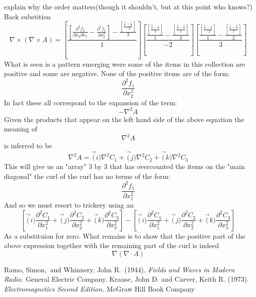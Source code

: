 \documentclass[12pt]{article}
\begin{document}
explain why the order matters(though it shouldn't, but at this point who knows?)
Back substition
\begin{equation}
\nabla \times (\nabla \times A) = \left[ \frac{\left[ \frac {\partial^2  f_2}{\partial x_2 \partial x_1} - \frac {\partial^2  f_1}{\partial x_2^2} \right] - \frac{\left[ \frac{\frac{3}{1} - \frac{1}{3}}{-2} \right]}{3}}{1} \right] \left[ \frac{\frac{\left[ \frac{\frac{2}{1} - \frac{1}{2}}{3} \right]}{1} - \frac{\left[ \frac{\frac{3}{2} - \frac{2}{3}}{1} \right]}{3}}{-2} \right] \left[ \frac{\frac{\left[ \frac{\frac{3}{1} - \frac{1}{3}}{-2} \right] }{1} - \frac{ \left[ \frac{\frac{3}{2} - \frac{2}{3}}{1} \right]}{2}}{3} \right]
\end{equation}
What is seen is a pattern emerging were some of the items in this collection are positive and some are negative. None of the positive items are of the form:
\begin{equation}
\frac {\partial^2  f_1}{\partial x_2^2}
\end{equation}
In fact these all correspond to the expansion of the term:
\begin{equation}
-\nabla^2A
\end{equation}
Given the products that appear on the left hand side of the above equation the meaning of 
\begin{equation}
\nabla^2A
\end{equation}
is inferred to be
\begin{equation}
\nabla^2A = \vec(i)\nabla^2C_1 + \vec(j)\nabla^2C_2 + \vec(k)\nabla^2C_3 
\end{equation}
This will give us an "array" 3 by 3 that has overcounted the items on the "main diagonal" the curl of the curl has no terms of the form:
\begin{equation}
\frac {\partial^2  f_1}{\partial x_1^2}
\end{equation}
And so we must resort to trickery using an
\begin{equation}
\left[\vec(i)\frac {\partial^2  C_1}{\partial x_1^2} + \vec(j)\frac {\partial^2  C_2}{\partial x_2^2} + \vec(k)\frac {\partial^2  C_3}{\partial x_3^2}\right] - \left[\vec(i)\frac {\partial^2  C_1}{\partial x_1^2} + \vec(j)\frac {\partial^2  C_2}{\partial x_2^2} + \vec(k)\frac {\partial^2  C_3}{\partial x_3^2}\right]
\end{equation}
As a substituion for zero.
What remains is to show that the positive part of the above expression together with the remaining part of the curl is indeed
\begin{equation}
\nabla (\nabla \cdot A)
\end{equation}

\begin{thebibliography}{[AHU]}
 Ramo, Simon,\  and 
Whinnery, John R.\ (1944).  {\em{Fields and Waves in Modern Radio.}} General Electric Company.
 Krause, John D. and Carver, Keith R. 
(1973). {\em{Electromagnetics Second Edition.}} McGraw Hill Book Company
\end{thebibliography}
\end{document}
